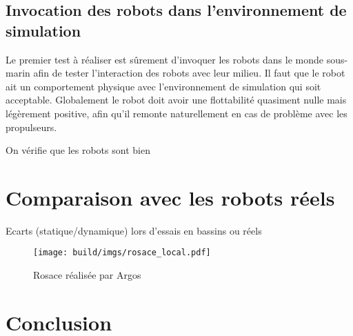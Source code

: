 		\subsection{Invocation des robots dans l'environnement de simulation}

			Le premier test à réaliser est sûrement d'invoquer les robots dans le monde sous-marin afin de tester l'interaction des robots avec leur milieu. Il faut que le robot ait un comportement physique avec l'environnement de simulation qui soit acceptable. Globalement le robot doit avoir une flottabilité quasiment nulle mais légèrement positive, afin qu'il remonte naturellement en cas de problème avec les propulseurs.

			On vérifie que les robots sont bien 

	\section{Comparaison avec les robots réels}

		Ecarts (statique/dynamique) lors d'essais en bassins ou réels

		\begin{figure}
			\texttt{[image: build/imgs/rosace\_local.pdf]}
			\caption{Rosace réalisée par Argos}
			\label{fig:rosace_argos}
		\end{figure}

	\section{Conclusion}